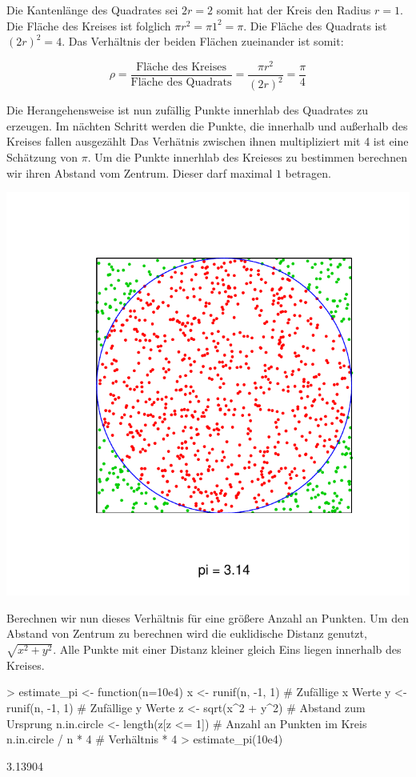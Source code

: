 Die Kantenlänge des Quadrates sei $2r=2$ somit hat der Kreis den Radius $r=1$. Die Fläche des Kreises ist folglich $\pi r^2 = \pi 1^2 = \pi$. Die Fläche des Quadrats ist $(2r)^2=4$. Das Verhältnis der beiden Flächen zueinander ist somit:

\begin{equation} \label{eq:pi}
  \rho = \frac{\text{Fläche des Kreises}}{\text{Fläche des Quadrats}} = \frac{\pi r^2}{(2r)^2} = \frac{\pi}{4}
\end{equation}

Die Herangehensweise ist nun zufällig Punkte innerhlab des Quadrates zu erzeugen. Im nächten Schritt werden die Punkte, die innerhalb und außerhalb des Kreises fallen ausgezählt Das Verhätnis zwischen ihnen multipliziert mit 4 ist eine Schätzung von $\pi$.
Um die Punkte innerhlab des Kreieses zu bestimmen berechnen wir ihren Abstand vom Zentrum. Dieser darf maximal $1$ betragen.

\includegraphics{sim_ch_pi-003}

Berechnen wir nun dieses Verhältnis für eine größere Anzahl an Punkten. Um den Abstand von Zentrum zu berechnen wird die euklidische Distanz genutzt, $\sqrt{x^2 + y^2}$. Alle Punkte mit einer Distanz kleiner gleich Eins liegen innerhalb des Kreises.
          
\begin{Schunk}
\begin{Sinput}
> estimate_pi <- function(n=10e4){
   x <- runif(n, -1, 1)                # Zufällige x Werte 
   y <- runif(n, -1, 1)                # Zufällige y Werte
   z <- sqrt(x^2 + y^2)                # Abstand zum Ursprung
   n.in.circle <- length(z[z <= 1])    # Anzahl an Punkten im Kreis
   n.in.circle / n * 4                 # Verhältnis * 4
 } 
> estimate_pi(10e4)
\end{Sinput}
\begin{Soutput}
[1] 3.13904
\end{Soutput}
\end{Schunk}

